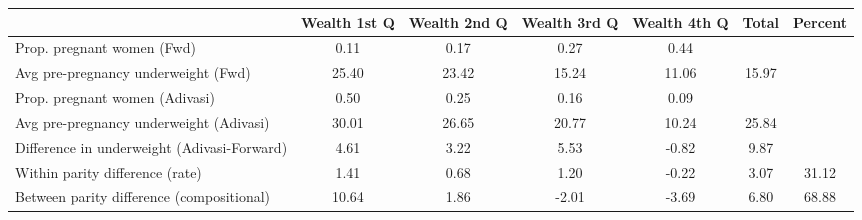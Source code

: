 \begin{tabular}{l*{6}{c}}
\toprule
            &\multicolumn{1}{c}{Wealth 1st Q}&\multicolumn{1}{c}{Wealth 2nd Q}&\multicolumn{1}{c}{Wealth 3rd Q}&\multicolumn{1}{c}{Wealth 4th Q}&\multicolumn{1}{c}{Total}&\multicolumn{1}{c}{Percent}\\
\midrule
\midrule
Prop. pregnant women (Fwd)&        0.11&        0.17&        0.27&        0.44&            &            \\
Avg pre-pregnancy underweight (Fwd)&       25.40&       23.42&       15.24&       11.06&       15.97&            \\
Prop. pregnant women (Adivasi)&        0.50&        0.25&        0.16&        0.09&            &            \\
Avg pre-pregnancy underweight (Adivasi)&       30.01&       26.65&       20.77&       10.24&       25.84&            \\
Difference in underweight (Adivasi-Forward)&        4.61&        3.22&        5.53&       -0.82&        9.87&            \\
Within parity difference (rate)&        1.41&        0.68&        1.20&       -0.22&        3.07&       31.12\\
Between parity difference (compositional)&       10.64&        1.86&       -2.01&       -3.69&        6.80&       68.88\\
\bottomrule
\end{tabular}
